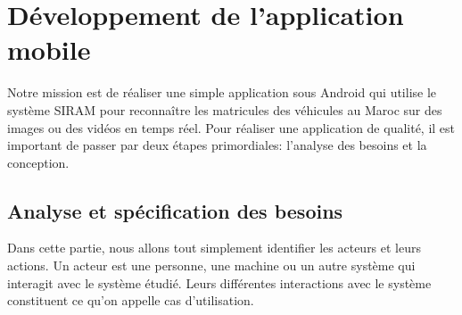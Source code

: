 \section{Développement de l'application mobile}
Notre mission est de réaliser une simple application sous Android qui utilise le système SIRAM pour reconnaître les matricules des véhicules au Maroc sur des images ou des vidéos en temps réel. Pour réaliser une application de qualité, il est important de passer par deux étapes primordiales: l'analyse des besoins et la conception.  
    \subsection{Analyse et spécification des besoins}
    Dans cette partie, nous allons tout simplement identifier les acteurs et leurs actions. Un acteur est une personne, une machine ou un autre système qui interagit avec le système étudié. Leurs différentes interactions avec le système constituent ce qu'on appelle cas d'utilisation.

